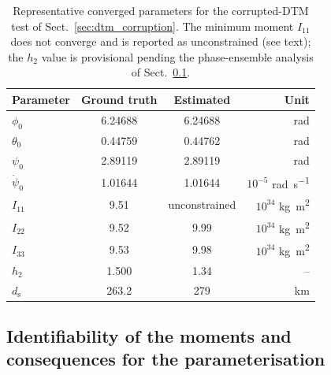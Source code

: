 \documentclass[lineno, pdflatex,sn-mathphys-ay]{sn-jnl}
\theoremstyle{thmstyleone}%
\theoremstyle{thmstyletwo}%
\theoremstyle{thmstylethree}%
\let\unit\si
\begin{document}
\begin{table}[h!]
\centering
\caption{Representative converged parameters for the corrupted-DTM test of Sect.~\ref{sec:dtm_corruption}. The minimum moment $I_{11}$ does not converge and is reported as unconstrained (see text); the $h_2$ value is provisional pending the phase-ensemble analysis of Sect.~\ref{sec:identifiability}.}
\label{tab:corrupted_dtm_estimates}
\begin{tabular}{l c c r}
\hline \hline
Parameter & Ground truth & Estimated & Unit \\
\hline
$\phi_0$        & \num{6.24688} & \num{6.24688} & \unit{rad} \\
$\theta_0$      & \num{0.44759} & \num{0.44762} & \unit{rad} \\
$\psi_0$        & \num{2.89119} & \num{2.89119} & \unit{rad} \\
$\dot{\psi}_0$  & \num{1.01644} & \num{1.01644} & $10^{-5}$ \unit{rad.s^{-1}} \\
$I_{11}$        & \num{9.51}    & \multicolumn{1}{c}{unconstrained} & $10^{34}$ \unit{kg.m^2} \\
$I_{22}$        & \num{9.52}    & \num{9.99}    & $10^{34}$ \unit{kg.m^2} \\
$I_{33}$        & \num{9.53}    & \num{9.98}    & $10^{34}$ \unit{kg.m^2} \\
$h_2$           & \num{1.500}   & \num{1.34}    & -- \\ %
\hline $d_\mathrm{s}$ & \num{263.2} & \num{279} & \unit{km} \\ %
\hline \hline
\end{tabular}
\end{table}


\subsection{Identifiability of the moments and consequences for the parameterisation}\label{sec:identifiability}
\end{document}
